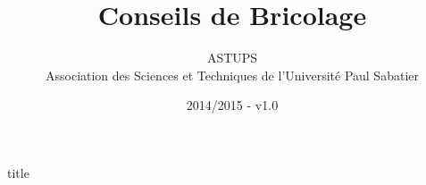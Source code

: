 \documentclass[a1,portrait]{a0poster}
\title{Conseils de Bricolage}
\author{ASTUPS\\{\small Association des Sciences et Techniques de l'Université Paul Sabatier}}
\date{2014/2015 - v1.0}
\begin{document}
\thispagestyle{empty}

\begin{staticcontents*}{title}
\maketitle

\newcommand{\tailleRegles}{\Large}


\end{staticcontents*}

\small

\def\tailleImageTournevis{0.3\columnwidth}
\def\formCoefficient{0.3}











\end{document}
